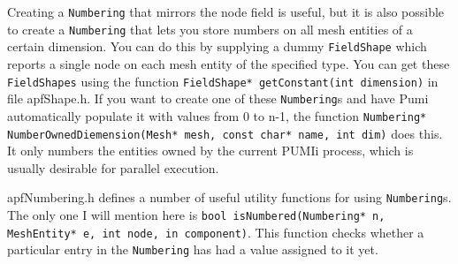 \documentclass[12pt]{article}
\newcommand{\ttt}{\texttt}
\begin{document}
Creating a \ttt{Numbering} that mirrors the node field is useful, but it is also possible to create a \ttt{Numbering} that lets you store numbers on all mesh entities of a certain dimension.  You can do this by supplying a dummy \ttt{FieldShape} which reports a single node on each mesh entity of the specified type.  You can get these \ttt{FieldShapes} using the function \ttt{FieldShape* getConstant(int dimension)} in file apfShape.h.  If you want to create one of these \ttt{Numbering}s and have Pumi automatically populate it with values from 0 to n-1, the function
\newline
\newline
\noindent\ttt{Numbering* NumberOwnedDiemension(Mesh* mesh, const char* name, int dim)}
\newline
\newline
does this.  It only numbers the entities owned by the current PUMIi process, which is usually desirable for parallel execution.

apfNumbering.h defines a number of useful utility functions for using \ttt{Numbering}s.  The only one I will mention here is 
\newline
\newline
\noindent\ttt{bool isNumbered(Numbering* n, MeshEntity* e, int node, in component)}.
\newline
\newline
This function checks whether a particular entry in the \ttt{Numbering} has had a value assigned to it yet.
\end{document}
